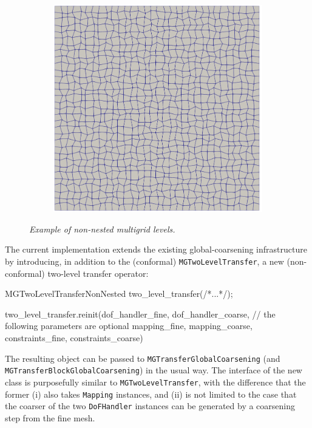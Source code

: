 \documentclass{ansarticle-preprint}
\begin{document}
\begin{figure}
\begin{subfigure}[b]{0.28\textwidth}
  \end{subfigure}
  \hfill
  \begin{subfigure}[b]{0.28\textwidth}
    \centering
    \includegraphics[width=\textwidth]{png/mesh_2.png}
  \end{subfigure}
  \caption{\it Example of non-nested multigrid levels.}\label{fig:nonnested}
\end{figure}

The current implementation extends the existing global-coarsening infrastructure by
introducing, in addition to the (conformal) \texttt{MGTwoLevelTransfer},
 a new (non-conformal) two-level transfer operator:
\begin{c++}
MGTwoLevelTransferNonNested two_level_transfer(/*...*/);

two_level_transfer.reinit(dof_handler_fine, dof_handler_coarse,
                          // the following parameters are optional
                          mapping_fine, mapping_coarse,
                          constraints_fine, constraints_coarse)
\end{c++}
The resulting object can be passed to \texttt{MGTransferGlobalCoarsening} (and
\texttt{MGTransferBlockGlobalCoarsening}) in the usual way. The
interface of the new class is purposefully similar to
\texttt{MGTwoLevelTransfer},
with the difference that the former (i) also
takes \texttt{Mapping} instances, and (ii) is not limited to the case
that the coarser of the two \texttt{DoFHandler} instances can be generated by a coarsening step from the fine
mesh.
\end{document}
